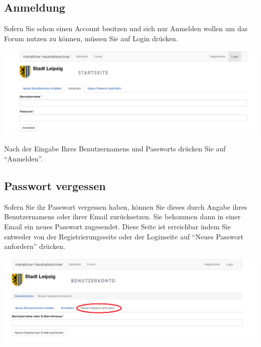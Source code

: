 \documentclass[a4paper,11pt,twoside]{article}
\begin{document}
\subsection{Anmeldung}
Sofern Sie schon einen Account besitzen und sich nur Anmelden wollen um das
Forum nutzen zu k\"onnen, m\"ussen Sie auf Login dr\"ucken.
\begin{center}
  \includegraphics[width=\textwidth]{Bilder/anmelden.png}
\end{center}
Nach der Eingabe Ihres Benutzernamens und Passworts dr\"ucken Sie auf
"`Anmelden"'.
\subsection{Passwort vergessen}
Sofern Sie ihr Passwort vergessen haben, k\"onnen Sie dieses durch Angabe
ihres Benutzernamens oder ihrer Email zur\"ucksetzen. Sie bekommen dann in
einer Email ein neues Passwort zugesendet.  Diese Seite ist erreichbar indem
Sie entweder von der Registrierungsseite oder der Loginseite auf "`Neues
Passwort anfordern"' dr\"ucken.
\begin{center}
  \includegraphics[width=\textwidth]{Bilder/neuesPasswort.png}
\end{center}
\end{document}
